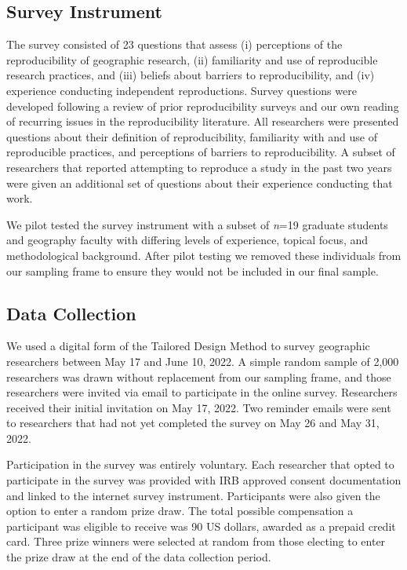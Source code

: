 \documentclass[]{interact}
\theoremstyle{plain}%
\theoremstyle{definition}
\theoremstyle{remark}
\begin{document}
\subsection*{Survey Instrument}
The survey consisted of 23 questions that assess (i) perceptions of the reproducibility of geographic research, (ii) familiarity and use of reproducible research practices, and (iii) beliefs about barriers to reproducibility, and (iv) experience conducting independent reproductions. 
Survey questions were developed following a review of prior reproducibility surveys \citep[e.g.,][]{fanelli2009many,baker20161, konkol2019} and our own reading of recurring issues in the reproducibility literature. 
All researchers were presented questions about their definition of reproducibility, familiarity with and use of reproducible practices, and perceptions of barriers to reproducibility. 
A subset of researchers that reported attempting to reproduce a study in the past two years were given an additional set of questions about their experience conducting that work.

We pilot tested the survey instrument with a subset of \textit{n}=19 graduate students and geography faculty with differing levels of experience, topical focus, and methodological background. 
After pilot testing we removed these individuals from our sampling frame to ensure they would not be included in our final sample.

\subsection*{Data Collection}
We used a digital form of the Tailored Design Method \citep{dillman2014internet} to survey geographic researchers between May 17 and June 10, 2022.
A simple random sample of 2,000 researchers was drawn without replacement from our sampling frame, and those researchers were invited via email to participate in the online survey. 
Researchers received their initial invitation on May 17, 2022. 
Two reminder emails were sent to researchers that had not yet completed the survey on May 26 and May 31, 2022.

Participation in the survey was entirely voluntary. 
Each researcher that opted to participate in the survey was provided with IRB approved consent documentation and linked to the internet survey instrument. 
Participants were also given the option to enter a random prize draw. 
The total possible compensation a participant was eligible to receive was 90 US dollars, awarded as a prepaid credit card.
Three prize winners were selected at random from those electing to enter the prize draw at the end of the data collection period.
\end{document}
